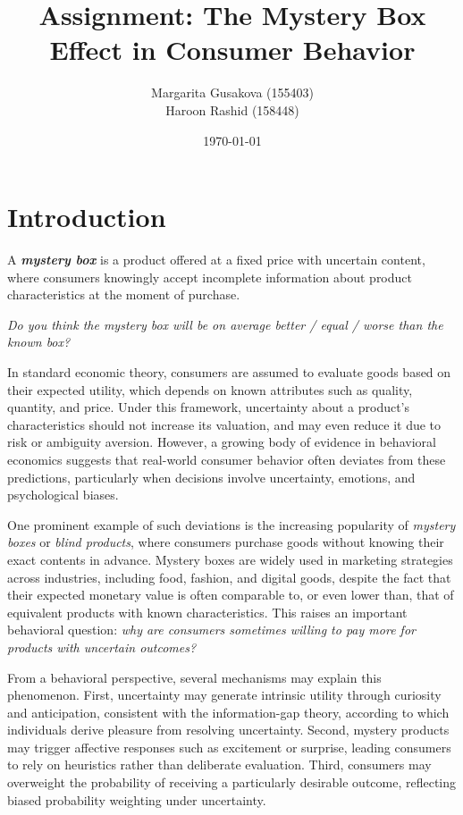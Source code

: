 \documentclass{article}
\title{Assignment: The Mystery Box Effect in Consumer Behavior }
\author{Margarita Gusakova (155403) \\
        Haroon Rashid (158448) }
\date{\today}
\begin{document}
\maketitle

\section{Introduction}
A \textbf{\emph{mystery box}} is a product offered at a fixed price with uncertain content, where consumers knowingly accept incomplete information about product characteristics at the moment of purchase.

\textit{Do you think the mystery box will be on average better / equal / worse than the known box?}

In standard economic theory, consumers are assumed to evaluate goods based on their expected utility, which depends on known attributes such as quality, quantity, and price. Under this framework, uncertainty about a product’s characteristics should not increase its valuation, and may even reduce it due to risk or ambiguity aversion. However, a growing body of evidence in behavioral economics suggests that real-world consumer behavior often deviates from these predictions, particularly when decisions involve uncertainty, emotions, and psychological biases.

One prominent example of such deviations is the increasing popularity of \emph{mystery boxes} or \emph{blind products}, where consumers purchase goods without knowing their exact contents in advance. Mystery boxes are widely used in marketing strategies across industries, including food, fashion, and digital goods, despite the fact that their expected monetary value is often comparable to, or even lower than, that of equivalent products with known characteristics. This raises an important behavioral question: \emph{why are consumers sometimes willing to pay more for products with uncertain outcomes?}

From a behavioral perspective, several mechanisms may explain this phenomenon. First, uncertainty may generate intrinsic utility through curiosity and anticipation, consistent with the information-gap theory, according to which individuals derive pleasure from resolving uncertainty. Second, mystery products may trigger affective responses such as excitement or surprise, leading consumers to rely on heuristics rather than deliberate evaluation. Third, consumers may overweight the probability of receiving a particularly desirable outcome, reflecting biased probability weighting under uncertainty.
\end{document}

